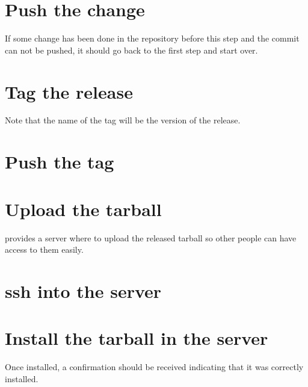 \section*{Push the change}

\noindent{}

If some change has been done in the repository before this step and the commit can not be pushed, it should go back to the first step and start over.

\section*{Tag the release}

\noindent{}

Note that the name of the tag will be the version of the release.

\section*{Push the tag}

\noindent{}

\newpage
\section*{Upload the tarball}

\GNOME provides a server where to upload the released tarball so other people can have access to them easily.

\noindent{}

\section*{ssh into the server}

\noindent{}

\section*{Install the tarball in the server}

\noindent{}

Once installed, a confirmation should be received indicating that it was correctly installed.
